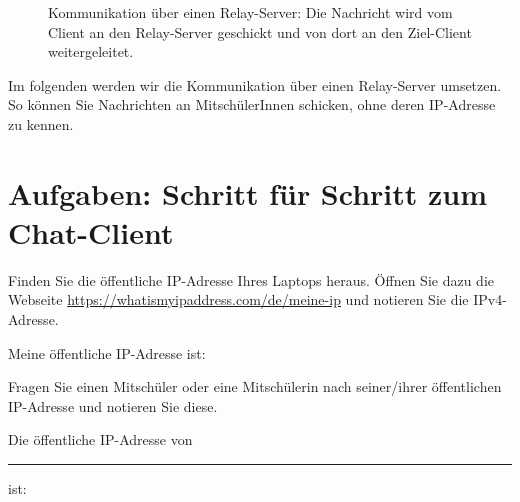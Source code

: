 \begin{figure}[H]
    \centering
    \caption{Kommunikation über einen Relay-Server: Die Nachricht wird vom Client an den Relay-Server geschickt und von dort an den Ziel-Client weitergeleitet.}
\end{figure}
Im folgenden werden wir die Kommunikation über einen Relay-Server umsetzen. So können Sie Nachrichten an MitschülerInnen schicken, ohne deren \gls{IP}-Adresse zu kennen.

\section{Aufgaben: Schritt für Schritt zum Chat-Client}

\begin{myexercise}
Finden Sie die öffentliche \gls{IP}-Adresse Ihres Laptops heraus. Öffnen Sie dazu die Webseite \url{https://whatismyipaddress.com/de/meine-ip} und notieren Sie die \gls{IP}v4-Adresse.

    
Meine öffentliche IP-Adresse ist: \ipPlaceHolder

\end{myexercise}

\begin{myexercise}
Fragen Sie einen Mitschüler oder eine Mitschülerin nach seiner/ihrer öffentlichen IP-Adresse und notieren Sie diese.
\begin{myanswer}
Die öffentliche IP-Adresse von \rule{2.5cm}{0.15mm} ist: \ipPlaceHolder
\end{myanswer}
\end{myexercise}

